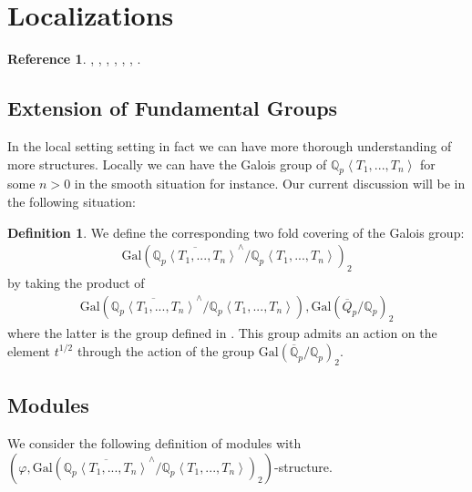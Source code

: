 \documentclass[12pt]{book}
\theoremstyle{definition}
\newtheorem{definition}{Definition}
\newtheorem{reference}{Reference}
\begin{document}
\newpage
\section{Localizations}


\begin{reference}
\cite{AI1}, \cite{AI2}, \cite{AB1}, \cite{AB2}, \cite{Fon2}, \cite{Fon3}, \cite{Fa1}.
\end{reference}



\subsection{Extension of Fundamental Groups}

\indent In the local setting setting in fact we can have more thorough understanding of more structures. Locally we can have the Galois group of $\mathbb{Q}_p\left<T_1,...,T_n\right>$ for some $n>0$ in the smooth situation for instance. Our current discussion will be in the following situation:

\begin{definition}
We define the corresponding two fold covering of the Galois group:
\begin{align}
\mathrm{Gal}(\overline{\mathbb{Q}_p\left<T_1,...,T_n\right>}^\wedge/\mathbb{Q}_p\left<T_1,...,T_n\right>)_2
\end{align}
by taking the product of
\begin{align}
\mathrm{Gal}(\overline{\mathbb{Q}_p\left<T_1,...,T_n\right>}^\wedge/\mathbb{Q}_p\left<T_1,...,T_n\right>),\mathrm{Gal}(\overline{Q}_p/\mathbb{Q}_p)_2
\end{align}
where the latter is the group defined in \cite[Just before Lemma 7.5]{BS}. This group admits an action on the element $t^{1/2}$ through the action of the group $\mathrm{Gal}(\overline{\mathbb{Q}}_p/\mathbb{Q}_p)_2$.
\end{definition}


\subsection{Modules}

\noindent We consider the following definition of modules with $(\varphi,\mathrm{Gal}(\overline{\mathbb{Q}_p\left<T_1,...,T_n\right>}^\wedge/\mathbb{Q}_p\left<T_1,...,T_n\right>)_2)$-structure.
\end{document}
